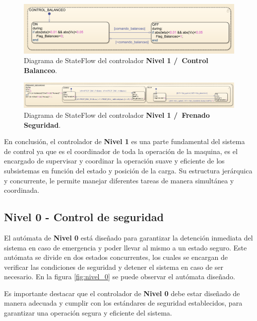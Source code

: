 \documentclass[11pt]{article}
\begin{document}
\begin{figure}
	\centering
	\includegraphics[width=1\textwidth]{images/imagen_24_nivel_1_control_balanceo.png}
	\caption{Diagrama de StateFlow del controlador \textbf{Nivel 1 /\ Control Balanceo}.}
	\label{fig:nivel_1_control_balanceo}
\end{figure}

\begin{figure}
	\centering
	\includegraphics[width=1\textwidth]{images/imagen_25_nivel_1_frenado_seguridad.png}
	\caption{Diagrama de StateFlow del controlador \textbf{Nivel 1 /\ Frenado Seguridad}.}
	\label{fig:nivel_1_frenado_seguridad}
\end{figure}

\newpage

En conclusión, el controlador de \textbf{Nivel 1} es una parte fundamental del sistema de control ya que es el coordinador de toda la operación de la maquina, es el encargado de supervisar y coordinar la operación suave y eficiente de los subsistemas en función del estado y posición de la carga. Su estructura jerárquica y concurrente, le permite manejar diferentes tareas de manera simultánea y coordinada.

\subsection{Nivel 0 - Control de seguridad}

El autómata de \textbf{Nivel 0} está diseñado para garantizar la detención inmediata del sistema en caso de emergencia y poder llevar al mismo a un estado seguro. Este autómata se divide en dos estados concurrentes, los cuales se encargan de verificar las condiciones de seguridad y detener el sistema en caso de ser necesario. En la figura \ref{fig:nivel_0} se puede observar el autómata diseñado.

Es importante destacar que el controlador de \textbf{Nivel 0} debe estar diseñado de manera adecuada y cumplir con los estándares de seguridad establecidos, para garantizar una operación segura y eficiente del sistema.
\end{document}
